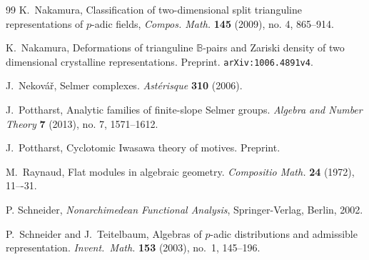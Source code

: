 \documentclass[12pt]{article}
\theoremstyle{definition}
\numberwithin{equation}{theorem}
\newcommand{\BB}{\mathbb{B}}
\begin{document}
\begin{thebibliography}{99}
K.~Nakamura,
Classification of two-dimensional split trianguline representations of $p$-adic fields, \textit{Compos. Math.} {\bf 145} (2009), no. 4, 865--914.

K.~Nakamura,
Deformations of trianguline $\BB$-pairs and Zariski density of two dimensional crystalline representations.  Preprint.  \texttt{arXiv:1006.4891v4}.

J.~Nekov\'a\v{r}, Selmer complexes. {\it Ast\'erisque} {\bf 310} (2006).

 J.~Pottharst, Analytic families of finite-slope
  Selmer groups.  \textit{Algebra and Number Theory} {\bf 7} (2013),
  no. 7, 1571--1612.

 J.~Pottharst, Cyclotomic Iwasawa theory of
  motives.  Preprint.

M.~Raynaud,
Flat modules in algebraic geometry. 
{\it Compositio Math.} {\bf 24} (1972), 11–-31.

P. Schneider, \textit{Nonarchimedean Functional Analysis}, Springer-Verlag, Berlin, 2002.

 P.~Schneider and J.~Teitelbaum, Algebras of $p$-adic
  distributions and admissible representation.  {\it Invent.\ Math.}
  {\bf 153} (2003), no.~1, 145--196.


\end{thebibliography}
\end{document}
